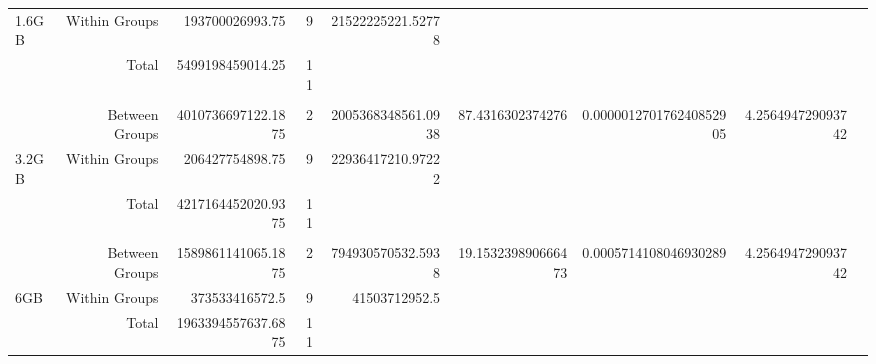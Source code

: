 \begin{landscape}
\begin{table}[!htp]
\begin{tabular}{lrrrrrrrr}
1.6GB &Within Groups &193700026993.75 &9 &21522225221.52778 & & & \\
&Total &5499198459014.25 &11 & & & & \\
& & & & & & & \\
&Between Groups &4010736697122.1875 &2 &2005368348561.0938 &87.4316302374276 &0.000001270176240852905 &4.256494729093742 \\
3.2GB &Within Groups &206427754898.75 &9 &22936417210.97222 & & & \\
&Total &4217164452020.9375 &11 & & & & \\
& & & & & & & \\
&Between Groups &1589861141065.1875 &2 &794930570532.5938 &19.153239890666473 &0.0005714108046930289 &4.256494729093742 \\
6GB &Within Groups &373533416572.5 &9 &41503712952.5 & & & \\
&Total &1963394557637.6875 &11 & & & & \\
\bottomrule
\end{tabular}
\end{table}

\end{landscape}
